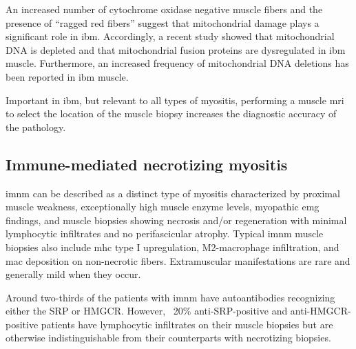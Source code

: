 An increased number of cytochrome oxidase negative muscle fibers and the presence of “ragged red fibers” suggest that mitochondrial damage plays a significant role in \gls{ibm}.\cite{Dalakas2002} Accordingly, a recent study showed that mitochondrial DNA is depleted and that mitochondrial fusion proteins are dysregulated in \gls{ibm} muscle.\cite{CatalanGarcia2016} Furthermore, an increased frequency of mitochondrial DNA deletions has been reported in \gls{ibm} muscle.\cite{Rygiel2016}

Important in \gls{ibm}, but relevant to all types of myositis, performing a muscle \gls{mri} to select the location of the muscle biopsy increases the diagnostic accuracy of the pathology.\cite{VanDeVlekkert2015}

\subsection{Immune-mediated necrotizing myositis}

\gls{imnm} can be described as a distinct type of myositis characterized by proximal muscle weakness, exceptionally high muscle enzyme levels, myopathic \gls{emg} findings, and muscle biopsies showing necrosis and/or regeneration with minimal lymphocytic infiltrates and no perifascicular atrophy. Typical \gls{imnm} muscle biopsies also include \gls{mhc} type I upregulation, M2-macrophage infiltration, and \gls{mac} deposition on non-necrotic fibers.\cite{Watanabe2016,Chung2015} Extramuscular manifestations are rare and generally mild when they occur.\cite{PinalFernandez2017b,Suzuki2015,Tiniakou2017}

Around two-thirds of the patients with \gls{imnm} have autoantibodies recognizing either the SRP or HMGCR. However, ~20\% anti-SRP-positive and anti-HMGCR-positive patients have lymphocytic infiltrates on their muscle biopsies but are otherwise indistinguishable from their counterparts with necrotizing biopsies.\cite{Suzuki2015,Mammen2011,Allenbach2018}

